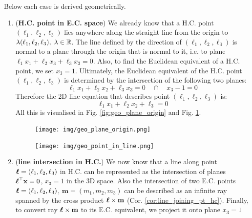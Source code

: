 \documentclass[a4paper]{article}
\begin{document}
Below each case is derived geometrically.
\begin{enumerate}
    \item (\textbf{H.C. point in E.C. space}) We already know that a H.C. point $(\ell_1, \ell_2, \ell_3)$ lies anywhere along the straight line from the origin to $\lambda(\ell_1, \ell_2, \ell_3), \; \lambda \in \mathbb{R}$. The line defined by the direction of $(\ell_1, \ell_2, \ell_3)$ is normal to a plane through the origin that is normal to it, i.e. to plane $\ell_1x_1 + \ell_2x_3 + \ell_3x_3 = 0$. Also, to find the Euclidean equivalent of a H.C. point, we set $x_3=1$. Ultimately, the Euclidean equivalent of the H.C. point $(\ell_1, \ell_2, \ell_3)$ is determined by the intersection of the following two planes:
    \[
    \ell_1x_1 + \ell_2x_2 + \ell_3x_3 = 0 \quad \cap \quad   x_3 - 1 = 0
    \]
    Therefore the 2D line equation that describes point $(\ell_1,\ell_2,\ell_3)$ is:
    \[
        \ell_1x_1 + \ell_2x_2 + \ell_3 = 0 
    \]
    All this is visualised in Fig. \ref{fig:geo_plane_origin} and Fig. \ref{fig:geo_point_in_line}.
\begin{figure}[H]
    \centering
    \begin{minipage}{.4\textwidth}
      \centering
      \texttt{[image: img/geo\_plane\_origin.png]}
      \label{fig:geo_plane_origin}
    \end{minipage}%
    \begin{minipage}{.5\textwidth}
      \centering
      \texttt{[image: img/geo\_point\_in\_line.png]}
      \label{fig:geo_point_in_line}
    \end{minipage}
\end{figure}

    \item (\textbf{line intersection in H.C.}) We now know that a line along point $\boldsymbol{\ell} = (\ell_1, \ell_2, \ell_3)$ in H.C. can be represented as the intersection of planes $\boldsymbol{\ell}^{\top} \textbf{x}=0$, $x_3 = 1$ in the 3D space. Also the intersection of two E.C. points $\boldsymbol{\ell} = (\ell_1, \ell_2, \ell_3)$, $\textbf{m} = (m_1, m_2, m_3)$ can be described as an infinite ray spanned by the cross product $\boldsymbol{\ell} \times \textbf{m}$ (Cor. \ref{cor:line_joining_pt_hc}). Finally, to convert ray $\boldsymbol{\ell} \times \textbf{m}$ to its E.C. equivalent, we project it onto plane $x_3=1$
    

\end{enumerate}
\end{document}
